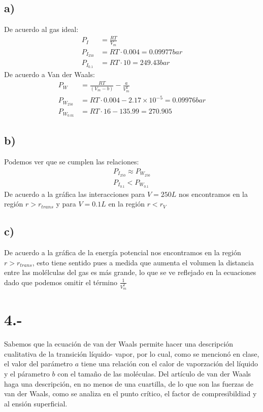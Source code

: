 \documentclass{article}
\begin{document}
\begin{tcolorbox}[breakable]
    \subsection*{a)}
    De acuerdo al gas ideal:
    \begin{align*}
        P_{I} 
        &= \frac{RT}{V_m} \\
        P_{I_{250}}
        &= RT \cdot 0.004 = 0.09977 bar\\ 
        P_{I_{0.1}}
        &= RT \cdot 10 = 249.43 bar 
    \end{align*}
    De acuerdo a Van der Waals:
    \begin{align*}
        P_{W}
        &= \frac{RT}{(V_m - b)} - \frac{a}{V_m^2} \\
        P_{W_{250}}
        &= RT \cdot 0.004 - 2.17\times 10^{-5} = 0.09976 bar \\
        P_{W_{0.01}}
        &= RT \cdot 16 - 135.99 = 270.905
    \end{align*}

    \subsection*{b)}
    Podemos ver que se cumplen las relaciones:
    \begin{align*}
        P_{I_{250}} \approx P_{W_{250}} \\
        P_{I_{0.1}} < P_{W_{0.1}}
    \end{align*}
    De acuerdo a la gráfica las interacciones para $V=250L$ nos encontramos en 
    la región $r > r_{trans}$ y para $V=0.1L$ en la región $r < r_V$

    \subsection*{c)}
    De acuerdo a la gráfica de la energía potencial nos encontramos en la región 
    $r > r_{trans}$, esto tiene sentido pues a medida que aumenta el volumen 
    la distancia entre las molélculas del gas es más grande, lo que se ve reflejado  
    en la ecuaciones dado que podemos omitir el término $\frac{1}{V_m^2}$


\end{tcolorbox}
\section*{4.-}
Sabemos que la ecuación de van der Waals permite hacer una descripción cualitativa 
de la transición líquido- vapor, por lo cual, como se mencionó en clase, el 
valor del parámetro $a$ tiene una relación con el calor de vaporzación del líquido y 
el párametro $b$  con el tamaño de las moléculas. Del artículo de van der Waals haga 
una descripción, en no menos de una cuartilla, de lo que son las fuerzas de 
van der Waals, como se analiza en el punto crítico, el factor de compresibildiad y al 
ensión superficial.
\end{document}
